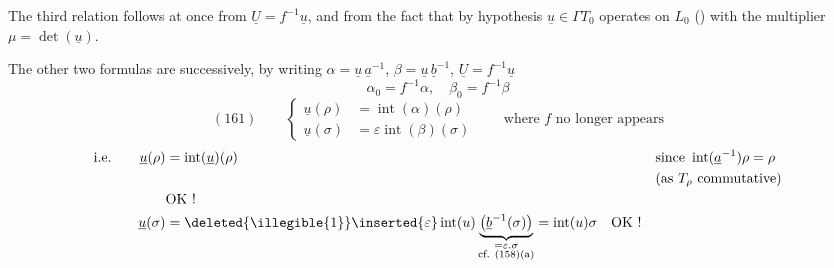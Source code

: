 The third relation follows at once from $\underline U=f^{-1}\underline u$, and from the fact that by hypothesis  $\underline u\in\Gamma T_0$ operates on $L_0$ () with the multiplier $\mu=\det(\underline u)$.


The other two formulas are  successively, by writing $\alpha=\underline u\,\underline a^{-1}$, $\beta=\underline u\,\underline b^{-1}$, $\underline U=f^{-1}\underline u$
\[
\alpha_0=f^{-1}\alpha,\quad\beta_0=f^{-1}\beta
\]
\[
(161)\qquad
\left\{
\begin{aligned}
\underline u(\rho)&=\operatorname{int}(\alpha)(\rho)\\
\underline u(\sigma)&=\varepsilon\operatorname{int}(\beta)(\sigma)
\end{aligned}
\right.
\qquad\text{where }f\text{ no longer appears}
\]
\[
\begin{aligned}
\text{i.e.}\qquad\underline u(\rho)&=\operatorname{int}(\underline u)(\rho)
&&\text{since }\operatorname{int}(\underline a^{-1})\rho=\rho\\
&&&\text{(as }T_\rho\text{ commutative)}\\
&\text{OK !}\\
\underline u(\sigma)&=\deleted{\illegible{1}}\inserted{\varepsilon}\operatorname{int}(u)
\underbrace{\bigl(\underline b^{-1}(\sigma)\bigr)}_{\substack{=\varepsilon.\sigma\\\text{cf. (158)(a)}}}
=\operatorname{int}(u)\sigma\quad\text{OK !}
\end{aligned}
\]

